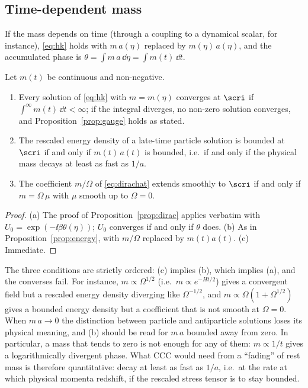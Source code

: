 \subsection{Time-dependent mass}
\label{sec:varmass}

If the mass depends on time (through a coupling to a dynamical scalar, for instance), \eqref{eq:hk} holds with $m\,a(\eta)$ replaced by $m(\eta)\,a(\eta)$, and the accumulated phase is $\theta=\int m\,a\,\dd\eta=\int m(t)\,\dd t$.

\begin{proposition}
\label{prop:varmass}
Let $m(t)$ be continuous and non-negative.
\begin{enumerate}[label=(\alph*)]
\item Every solution of \eqref{eq:hk} with $m=m(\eta)$ converges at $\scri$ if $\int^{\infty}m(t)\,\dd t<\infty$; if the integral diverges, no non-zero solution converges, and Proposition~\ref{prop:gauge} holds as stated.
\item The rescaled energy density of a late-time particle solution is bounded at $\scri$ if and only if $m(t)\,a(t)$ is bounded, i.e.\ if and only if the physical mass decays at least as fast as $1/a$.
\item The coefficient $m/\Omega$ of \eqref{eq:dirachat} extends smoothly to $\scri$ if and only if $m=\Omega\,\mu$ with $\mu$ smooth up to $\Omega=0$.
\end{enumerate}
\end{proposition}
\begin{proof}
(a) The proof of Proposition~\ref{prop:dirac} applies verbatim with $U_{0}=\exp(-\ii\beta\theta(\eta))$; $U_{0}$ converges if and only if $\theta$ does. (b) As in Proposition~\ref{prop:energy}, with $m/\Omega$ replaced by $m(t)a(t)$. (c) Immediate.
\end{proof}

The three conditions are strictly ordered: (c) implies (b), which implies (a), and the converses fail. For instance, $m\propto\Omega^{1/2}$ (i.e.\ $m\propto e^{-Ht/2}$) gives a convergent field but a rescaled energy density diverging like $\Omega^{-1/2}$, and $m\propto\Omega(1+\Omega^{1/2})$ gives a bounded energy density but a coefficient that is not smooth at $\Omega=0$. When $m\,a\to0$ the distinction between particle and antiparticle solutions loses its physical meaning, and (b) should be read for $m\,a$ bounded away from zero. In particular, a mass that tends to zero is not enough for any of them: $m\propto1/t$ gives a logarithmically divergent phase. What CCC would need from a ``fading'' of rest mass is therefore quantitative: decay at least as fast as $1/a$, i.e.\ at the rate at which physical momenta redshift, if the rescaled stress tensor is to stay bounded.

